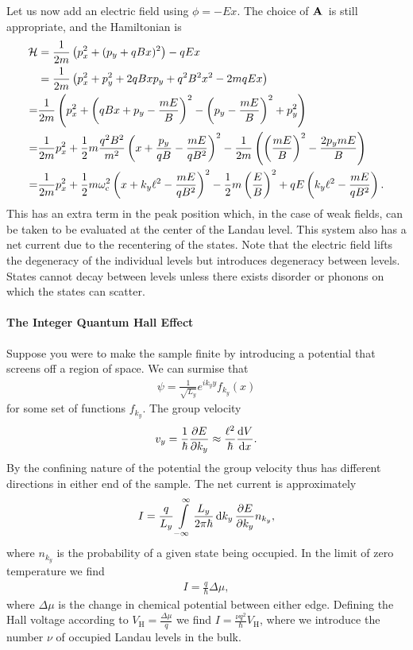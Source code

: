 Let us now add an electric field using $\phi = -Ex$. The choice of $\vb{A}$ is still appropriate, and the Hamiltonian is
\begin{align*}
	\mathcal{H} &= \frac{1}{2m}\left(p_{x}^{2} + (p_{y} + qBx)^{2}\right) - qEx \\
	     &= \frac{1}{2m}\left(p_{x}^{2} + p_{y}^{2} + 2qBxp_{y} + q^{2}B^{2}x^{2} - 2mqEx\right) \\
	     =& \frac{1}{2m}\left(p_{x}^{2} + \left(qBx + p_{y} - \frac{mE}{B}\right)^{2} - \left(p_{y} - \frac{mE}{B}\right)^{2} + p_{y}^{2}\right) \\
	     =& \frac{1}{2m}p_{x}^{2} + \frac{1}{2}m\frac{q^{2}B^{2}}{m^{2}}\left(x + \frac{p_{y}}{qB} - \frac{mE}{qB^{2}}\right)^{2} - \frac{1}{2m}\left(\left(\frac{mE}{B}\right)^{2} - \frac{2p_{y}mE}{B}\right) \\
	     =& \frac{1}{2m}p_{x}^{2} + \frac{1}{2}m\omega_{\text{c}}^{2}\left(x + k_{y}\ell^{2} - \frac{mE}{qB^{2}}\right)^{2} - \frac{1}{2}m\left(\frac{E}{B}\right)^{2} +  qE\left(k_{y}\ell^{2} - \frac{mE}{qB^{2}}\right).
\end{align*}
This has an extra term in the peak position which, in the case of weak fields, can be taken to be evaluated at the center of the Landau level. This system also has a net current due to the recentering of the states. Note that the electric field lifts the degeneracy of the individual levels but introduces degeneracy between levels. States cannot decay between levels unless there exists disorder or phonons on which the states can scatter.

\paragraph{The Integer Quantum Hall Effect}
Suppose you were to make the sample finite by introducing a potential that screens off a region of space. We can surmise that
\begin{align*}
	\psi = \frac{1}{\sqrt{L_{y}}}e^{ik_{y}y}f_{k_{y}}(x)
\end{align*}
for some set of functions $f_{k_{y}}$. The group velocity
\begin{align*}
	v_{y} = \frac{1}{\hbar}\pdv{E}{k_{y}} \approx \frac{\ell^{2}}{\hbar}\dv{V}{x}.
\end{align*}
By the confining nature of the potential the group velocity thus has different directions in either end of the sample. The net current is approximately
\begin{align*}
	I = \frac{q}{L_{y}}\int\limits_{-\infty}^{\infty}\frac{L_{y}}{2\pi\hbar}\dd{k_{y}}\pdv{E}{k_{y}}n_{k_{y}},
\end{align*}
where $n_{k_{y}}$ is the probability of a given state being occupied. In the limit of zero temperature we find
\begin{align*}
	I = \frac{q}{\hbar}\Delta\mu,
\end{align*}
where $\Delta\mu$ is the change in chemical potential between either edge. Defining the Hall voltage according to $V_{\text{H}} = \frac{\Delta\mu}{q}$ we find $I = \frac{\nu q^{2}}{\hbar}V_{\text{H}}$, where we introduce the number $\nu$ of occupied Landau levels in the bulk.